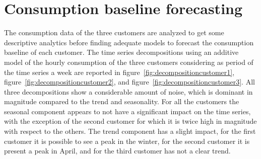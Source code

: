 \section{Consumption baseline forecasting} 
\label{sec:baselineval}
\vspace{0.2 cm}

The consumption data of the three customers are analyzed to get some descriptive analytics before finding adequate models to forecast the consumption baseline of each customer.
The time series decompositions using an additive model of the hourly consumption of the three customers considering as period of the time series a week are reported in figure~\ref{fig:decompositioncustomer1}, figure~\ref{fig:decompositioncustomer2}, and figure~\ref{fig:decompositioncustomer3}.
All three decompositions show a considerable amount of noise, which is dominant in magnitude compared to the trend and seasonality.
For all the customers the seasonal component appears to not have a significant impact on the time series, with the exception of the second customer for which it is twice high in magnitude with respect to the others.
The trend component has a slight impact, for the first customer it is possible to see a peak in the winter, for the second customer it is present a peak in April, and for the third customer has not a clear trend.

